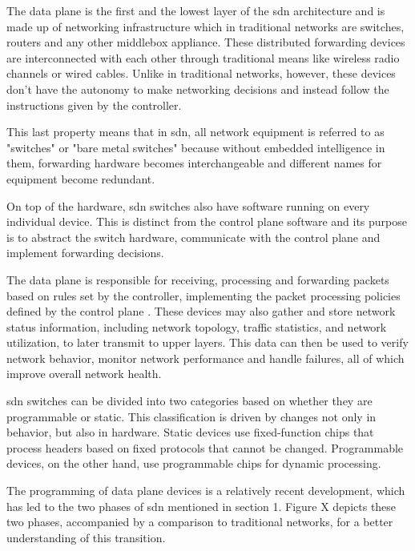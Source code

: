 The data plane is the first and the lowest layer of the \gls{sdn} architecture and is made up of networking infrastructure which in traditional networks are switches, routers and any other middlebox appliance. These distributed forwarding devices are interconnected with each other through traditional means like wireless radio channels or wired cables. Unlike in traditional networks, however, these devices don't have the autonomy to make networking decisions and instead follow the instructions given by the controller\cite{kreutz_software-defined_2015}. 

This last property means that in \gls{sdn}, all network equipment is referred to as "switches" or "bare metal switches"\cite{peterson_software-defined_2021} because without embedded intelligence in them, forwarding hardware becomes interchangeable and different names for equipment become redundant.

On top of the hardware, \gls{sdn} switches also have software running on every individual device. This is distinct from the control plane software and its purpose is to abstract the switch hardware, communicate with the control plane and implement forwarding decisions.  \cite{peterson_software-defined_2021}

The data plane is responsible for receiving, processing and forwarding packets based on rules set by the controller, implementing the packet processing policies defined by the control plane\cite{mckeown_openflow_2008}  \cite{xia_survey_2015}. These devices may also gather and store network status information, including network topology, traffic statistics, and network utilization, to later transmit to upper layers\cite{xia_survey_2015}. This data can then be used to verify network behavior, monitor network performance and handle failures, all of which improve overall network health\cite{bifulco_survey_2018}.


\gls{sdn} switches can be divided into two categories based on whether they are programmable or static. This classification is driven by changes not only in behavior, but also in hardware. Static devices use fixed-function chips that process headers based on fixed protocols that cannot be changed. Programmable devices, on the other hand, use programmable chips for dynamic processing. \cite{peterson_software-defined_2021}

The programming of data plane devices is a relatively recent development, which has led to the two phases of \gls{sdn} mentioned in section 1. Figure X depicts these two phases, accompanied by a comparison to traditional networks, for a better understanding of this transition.

